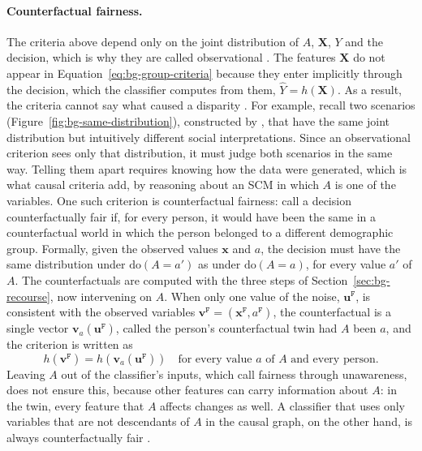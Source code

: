 \paragraph{Counterfactual fairness.}
The criteria above depend only on the joint distribution of $A$, $\mathbf{X}$, $Y$ and the
decision, which is why they are called observational \cite{kilbertus2017avoiding}. The features
$\mathbf{X}$ do not appear in Equation~\eqref{eq:bg-group-criteria} because they enter implicitly
through the decision, which the classifier computes from them, $\hat{Y} = h(\mathbf{X})$. As a result,
the criteria cannot say what caused a disparity \citep[Ch.~3]{barocas2023fairness}.
For example, \citet{kilbertus2017avoiding} recall two scenarios
(Figure~\ref{fig:bg-same-distribution}), constructed by
\citet{hardt2016equality}, that have the same joint distribution but intuitively different social
interpretations. Since an observational criterion sees only that distribution, it must judge both
scenarios in the same way. Telling them apart requires knowing how the data were generated, which
is what causal criteria add, by reasoning about an SCM in which $A$ is one of the variables. One
such criterion is counterfactual fairness: \citet{kusner2017counterfactual} call a decision
counterfactually fair if, for every person, it would have been the same in a counterfactual world in which the person
belonged to a different demographic group. Formally, given the observed values $\mathbf{x}$ and
$a$, the decision must have the same distribution under $\mathrm{do}(A = a')$ as under
$\mathrm{do}(A = a)$, for every value $a'$ of $A$. The counterfactuals are computed with the three
steps of Section~\ref{sec:bg-recourse}, now intervening on $A$. When only one value of the noise,
$\mathbf{u}^{\mathtt{F}}$, is consistent with the observed variables
$\mathbf{v}^{\mathtt{F}} = (\mathbf{x}^{\mathtt{F}}, a^{\mathtt{F}})$, the counterfactual is a
single vector $\mathbf{v}_a(\mathbf{u}^{\mathtt{F}})$, called the person's counterfactual twin had
$A$ been $a$, and the criterion is written as~\cite{vonkugelgen2022fairness}
\begin{equation}
  h(\mathbf{v}^{\mathtt{F}}) = h(\mathbf{v}_a(\mathbf{u}^{\mathtt{F}}))
  \quad \mbox{for every value } a \mbox{ of } A \mbox{ and every person.}
  \label{eq:bg-cf-fairness}
\end{equation}
Leaving $A$ out of the classifier's inputs, which \citet{kusner2017counterfactual} call fairness
through unawareness, does not ensure this, because other features can carry information about
$A$: in the twin, every feature that $A$ affects changes as well. A classifier that uses only
variables that are not descendants of $A$ in the causal graph, on the other hand, is always
counterfactually fair \citep[Lemma~1]{kusner2017counterfactual}.

